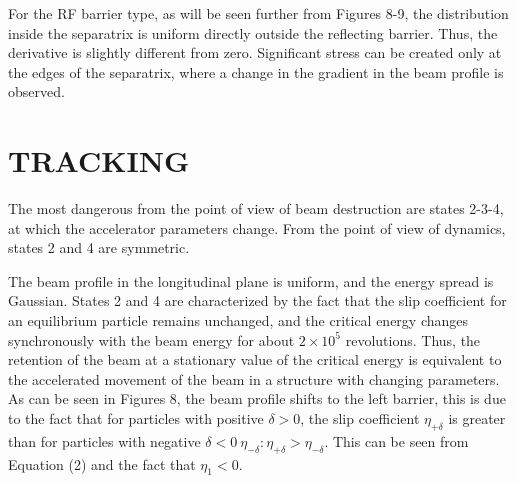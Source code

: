 \documentclass[
aps,%
12pt,%
final,%
notitlepage,%
oneside,%
onecolumn,%
nobibnotes,%
nofootinbib,%
superscriptaddress,%
noshowpacs,%
centertags]%
{revtex4}
\begin{document}
\par For the RF barrier type, as will be seen further from Figures 8-9, the distribution inside the separatrix is uniform directly outside the reflecting barrier. Thus, the derivative is slightly different from zero. Significant stress can be created only at the edges of the separatrix, where a change in the gradient in the beam profile is observed.

\section{TRACKING}

\par The most dangerous from the point of view of beam destruction are states 2-3-4, at which the accelerator parameters change. From the point of view of dynamics, states 2 and 4 are symmetric.

\par The beam profile in the longitudinal plane is uniform, and the energy spread is Gaussian. States 2 and 4 are characterized by the fact that the slip coefficient for an equilibrium particle remains unchanged, and the critical energy changes synchronously with the beam energy for about $2\times{10}^5$ revolutions. Thus, the retention of the beam at a stationary value of the critical energy is equivalent to the accelerated movement of the beam in a structure with changing parameters. As can be seen in Figures 8, the beam profile shifts to the left barrier, this is due to the fact that for particles with positive $\delta>0$, the slip coefficient $\eta_{+\delta}$ is greater than for particles with negative $\delta<0\ \eta_{-\delta}: \eta_{+\delta}>\eta_{-\delta}$. This can be seen from Equation (2) and the fact that $\eta_1<0$.
\end{document}
